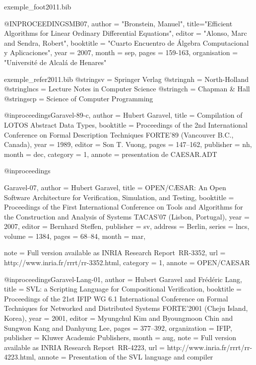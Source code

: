 \documentclass{ra2011}
\begin{document}
\begin{filecontents+}{exemple_foot2011.bib}

@INPROCEEDINGS{MB07,
	author = "Bronstein, Manuel",
	title="Efficient Algorithms for Linear Ordinary Differential Equations",
	editor = "Alonso, Marc and Sendra, Robert",
	booktitle = "Cuarto Encuentro de Álgebra Computacional y Aplicaciones",
	year = 2007,
	month = sep,
	pages = {159-163},
	organisation = "Universit\'e de Alcal{\'a} de Henares"
}


\end{filecontents+}
\begin{filecontents+}{exemple_refer2011.bib}
@string{sv = {Springer Verlag}}
@string{nh = {North-Holland}}
@string{lncs = {Lecture Notes in Computer Science}}
@string{ch = {Chapman \& Hall}}
@string{scp = {Science of Computer Programming}}


@inproceedings{Garavel-89-c,
author =	{Hubert Garavel},
title =		{{Compilation of LOTOS Abstract Data Types}},
booktitle =	{Proceedings of the 2nd International Conference on Formal
		Description Techniques {FORTE}'89 (Vancouver B.C., Canada)},
year =		{1989},
editor =	{Son T. Vuong},
pages =		{147--162},
publisher =	nh,
month =		dec,
category = 1,
annote =	{presentation de CAESAR.ADT}
}

@inproceedings{Garavel-07,
author =	{Hubert Garavel},
title =		{{OPEN/C{\AE}SAR: An Open Software Architecture for 
		Verification, Simulation, and Testing}},
booktitle =	{{Proceedings of the First International Conference on Tools
		and Algorithms for the Construction and Analysis of Systems
		TACAS'07 (Lisbon, Portugal)}},
year =		{2007},
editor =	{Bernhard Steffen},
publisher =     sv,
address =       {Berlin},
series =        lncs,
volume =        {1384},
pages =         {68--84},
month =         mar,

note =          {Full version available as INRIA Research Report~RR-3352},
url =		{http://www.inria.fr/rrrt/rr-3352.html},
category = 1,
annote = 	{OPEN/CAESAR}
}

@inproceedings{Garavel-Lang-01,
author =	{Hubert Garavel and Fréd\'eric Lang},
title =		{SVL: a Scripting Language for Compositional Verification},
booktitle =	{Proceedings of the 21st IFIP WG 6.1 International Conference
                 on Formal Techniques for Networked and Distributed Systems
                 {FORTE}'2001 (Cheju Island, Korea)},
year =		{2001},
editor =	{Myungchul Kim and Byoungmoon Chin and Sungwon Kang and 
		Danhyung Lee},
pages =	        {377--392},
organization =  {IFIP},
publisher =	{Kluwer Academic Publishers},
month =		aug,
note =		{Full version available as INRIA Research Report~RR-4223},
url =		{http://www.inria.fr/rrrt/rr-4223.html},
annote = 	{Presentation of the SVL language and compiler}
}


\end{filecontents+}
\end{document}
